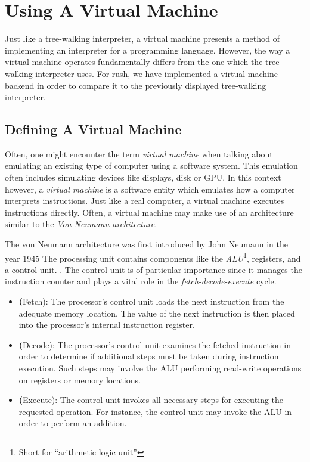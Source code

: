 \section{Using A Virtual Machine}

Just like a tree-walking interpreter, a virtual machine presents a method of implementing an interpreter for a programming language.
However, the way a virtual machine operates fundamentally differs from the one which the tree-walking interpreter uses.
For rush, we have implemented a virtual machine backend in order to compare it to the previously displayed tree-walking interpreter.

\subsection{Defining A Virtual Machine}

Often, one might encounter the term \emph{virtual machine} when talking about emulating an existing type of computer using a software system.
This emulation often includes simulating devices like displays, disk or GPU.
In this context however, a \emph{virtual machine} is a software entity which emulates how a computer interprets instructions.
Just like a real computer, a virtual machine executes instructions directly.
Often, a virtual machine may make use of an architecture similar to the \emph{Von Neumann architecture}.

The von Neumann architecture was first introduced by John Neumann in the year 1945
The processing unit contains components like the \emph{ALU}\footnote{Short for \enquote{arithmetic logic unit}}, registers, and a control unit.
\cite[p.~172]{Ledin2020-yp}.
The control unit is of particular importance since it manages the instruction counter and plays a vital role in the \emph{fetch-decode-execute} cycle.

\begin{itemize}
	\item \textbf(Fetch): The processor's control unit loads the next instruction from the adequate memory location.
	      The value of the next instruction is then placed into the processor's internal instruction register.
	\item \textbf(Decode):
	      The processor's control unit examines the fetched instruction in order to determine if additional steps must be taken during instruction execution.
	      Such steps may involve the ALU performing read-write operations on registers or memory locations.
	\item \textbf(Execute):
	      The control unit invokes all necessary steps for executing the requested operation.
	      For instance, the control unit may invoke the ALU in order to perform an addition.
\end{itemize}

